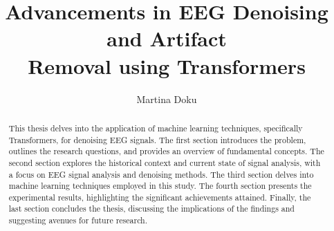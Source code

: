 \documentclass[a4paper, noexaminfo]{sapthesis}
\title{Advancements in EEG Denoising and Artifact\\ Removal using Transformers}
\author{Martina Doku}
\begin{document}
\maketitle
\dedication{To the things I have left behind to get here,\\because this 
milestone has given a meaning\\to every sacrifice.}

\begin{abstract}
  This thesis delves into the application of machine 
  learning techniques, specifically Transformers, for denoising 
  EEG signals.\newline
  The first section introduces the problem, outlines 
  the research questions, and provides an overview of fundamental 
  concepts. 
  The second section explores the historical context and current 
  state of signal analysis, with a focus on EEG signal analysis 
  and denoising methods. 
  The third section delves into machine learning techniques 
  employed in this study. 
  The fourth section presents the experimental results, 
  highlighting the significant achievements attained. 
  Finally, the last section concludes the thesis, discussing the 
  implications of the findings and suggesting avenues for future research.
\end{abstract}
\end{document}
